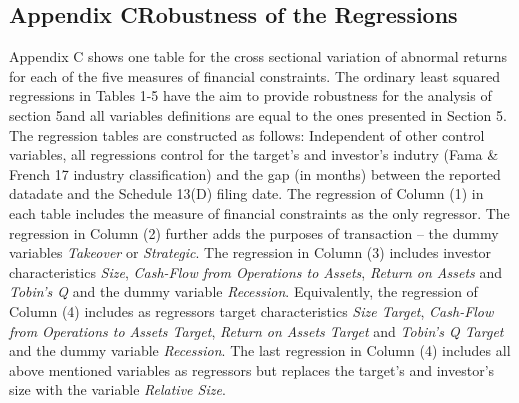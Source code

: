 \documentclass[12pt]{article}
\begin{document}
\begin{appendices}
\section*{ Appendix C\indent Robustness of the Regressions}
\noindent Appendix C shows one table for the cross sectional variation of abnormal returns for each of the five measures of financial constraints. The ordinary least squared regressions in Tables 1-5 have the aim to provide robustness for the analysis of section 5and all variables definitions are equal to the ones presented in Section 5. The regression tables are constructed as follows: Independent of other control variables, all regressions control for the target's and investor's indutry (Fama \& French 17 industry classification) and the gap (in months) between the reported datadate and the Schedule 13(D) filing date. The regression of Column (1) in each table includes the measure of financial constraints as the only regressor. The regression in Column (2) further adds the purposes of transaction -- the dummy variables \emph{Takeover} or \emph{Strategic}. The regression in Column (3) includes investor characteristics \emph{Size}, \emph{Cash-Flow from Operations to Assets}, \emph{Return on Assets} and \emph{Tobin's Q} and the dummy variable \emph{Recession}. Equivalently, the regression of Column (4) includes as regressors target characteristics \emph{Size Target}, \emph{Cash-Flow from Operations to Assets Target}, \emph{Return on Assets Target} and \emph{Tobin's Q Target} and the dummy variable \emph{Recession}. The last regression in Column (4) includes all above mentioned variables as regressors but replaces the target's and investor's size with the variable \emph{Relative Size}.


\end{appendices}
\end{document}
